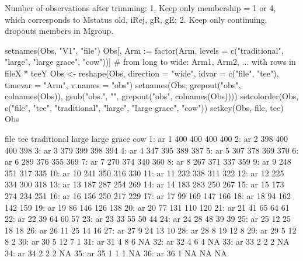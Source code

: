 Number of observations after trimming: 1. Keep only membership = 1 or 4, which corresponds to Mstatus old, iRej, gR, gE; 2. Keep only continuing, dropouts members in Mgroup.
\begin{Schunk}
\begin{Sinput}
setnames(Obs, "V1", "file")
Obs[, Arm := factor(Arm, levels = c("traditional", "large", "large grace", "cow"))]
# from long to wide: Arm1, Arm2, ... with rows in fileX * teeY
Obs <- reshape(Obs, direction = "wide", idvar = c("file", "tee"),
  timevar = "Arm", v.names = "obs")
setnames(Obs, grepout("obs", colnames(Obs)), 
  gsub("obs.", "", grepout("obs", colnames(Obs))))
setcolorder(Obs, c("file", "tee", "traditional", "large", "large grace", "cow"))
setkey(Obs, file, tee)
Obs
\end{Sinput}
\begin{Soutput}
    file tee traditional large large grace cow
 1:   ar   1         400   400         400 400
 2:   ar   2         398   400         400 398
 3:   ar   3         379   399         398 394
 4:   ar   4         347   395         389 387
 5:   ar   5         307   378         369 370
 6:   ar   6         289   376         355 369
 7:   ar   7         270   374         340 360
 8:   ar   8         267   371         337 359
 9:   ar   9         248   351         317 335
10:   ar  10         241   350         316 330
11:   ar  11         232   338         311 322
12:   ar  12         225   334         300 318
13:   ar  13         187   287         254 269
14:   ar  14         183   283         250 267
15:   ar  15         173   274         234 251
16:   ar  16         156   250         217 229
17:   ar  17          99   169         147 166
18:   ar  18          94   162         142 159
19:   ar  19          86   146         126 138
20:   ar  20          77   131         110 120
21:   ar  21          41    65          64  61
22:   ar  22          39    64          60  57
23:   ar  23          33    55          50  44
24:   ar  24          28    48          39  39
25:   ar  25          12    25          18  18
26:   ar  26          11    25          14  16
27:   ar  27           9    24          13  10
28:   ar  28           8    19          12   8
29:   ar  29           5    12           8   2
30:   ar  30           5    12           7   1
31:   ar  31           4     8           6  NA
32:   ar  32           4     6           4  NA
33:   ar  33           2     2           2  NA
34:   ar  34           2     2           2  NA
35:   ar  35           1     1           1  NA
36:   ar  36           1    NA          NA  NA

\end{Soutput}
\end{Schunk}
